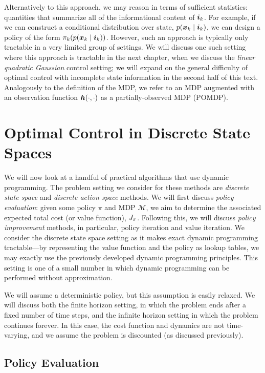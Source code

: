 Alternatively to this approach, we may reason in terms of sufficient statistics: quantities that summarize all of the informational content of $\bm{i}_k$. For example, if we can construct a conditional distribution over state, $p(\bm{x}_k\mid\bm{i}_k)$, we can design a policy of the form $\pi_k(p(\bm{x}_k\mid\bm{i}_k))$. However, such an approach is typically only tractable in a very limited group of settings. We will discuss one such setting where this approach is tractable in the next chapter, when we discuss the \textit{linear quadratic Gaussian} control setting; we will expand on the general difficulty of optimal control with incomplete state information in the second half of this text. Analogously to the definition of the MDP, we refer to an MDP augmented with an observation function $\bm{h}(\cdot,\cdot)$ as a partially-observed MDP (POMDP). 


\section{Optimal Control in Discrete State Spaces}

We will now look at a handful of practical algorithms that use dynamic programming. The problem setting we consider for these methods are \textit{discrete state space} and \textit{discrete action space} methods. We will first discuss \textit{policy evaluation}: given some policy $\pi$ and MDP $\mathcal{M}$, we aim to determine the associated expected total cost (or value function), $J_{\pi}$. Following this, we will discuss \textit{policy improvement} methods, in particular, policy iteration and value iteration. We consider the discrete state space setting as it makes exact dynamic programming tractable---by representing the value function and the policy as lookup tables, we may exactly use the previously developed dynamic programming principles. This setting is one of a small number in which dynamic programming can be performed without approximation. 

We will assume a deterministic policy, but this assumption is easily relaxed. We will discuss both the finite horizon setting, in which the problem ends after a fixed number of time steps, and the infinite horizon setting in which the problem continues forever. In this case, the cost function and dynamics are not time-varying, and we assume the problem is discounted (as discussed previously). 

\subsection{Policy Evaluation}

